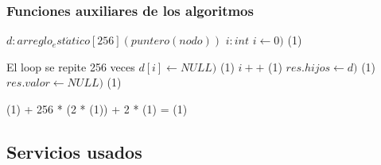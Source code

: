 \subsubsection{Funciones auxiliares de los algoritmos}

  {
    \var $d : arreglo_est\acute{a}tico[256] (puntero(nodo))$
    \var $i : int$
    \State $i \gets 0)$                									\comment \bigo(1)

     	\Statex             \comment El loop se repite 256 veces
     	\State $d[i] \gets NULL)$										\comment \bigo(1)
     	\State $i++$   													\comment \bigo(1) 
    \EndWhile						
    \State $res.hijos \gets d)$											\comment \bigo(1) 
    \State $res.valor \gets NULL)$   									\comment \bigo(1) 
}{   \bigo(1) + 256 * (2 * \bigo(1)) + 2 * \bigo(1) = \bigo(1) }

\subsection{Servicios usados}


